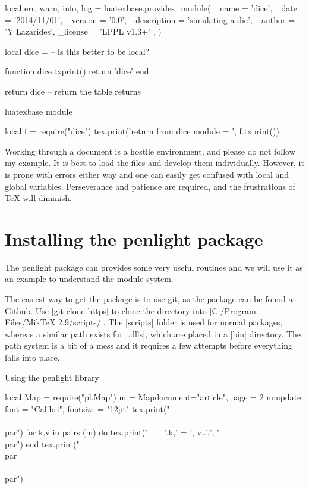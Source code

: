 \begin{teXXX}
local err, warn, info, log = luatexbase.provides_module({
     _name      = 'dice',
     _date       = '2014/11/01',
     _version   = '0.0',
     _description = 'simulating a die',
     _author      = 'Y Lazarides',
     _license      =  'LPPL v1.3+' ,
})

local dice =  {}    -- is this better to be local?

function dice.txprint()
    return 'dice'
end    

return dice         -- return the table returns {} 
\end{teXXX} 

\begin{texexample}{luatexbase module}{}

\begin{luacode}   
local  f = require("dice")           
        tex.print('return from dice module = ', f.txprint())
\end{luacode}

\end{texexample}

Working through a document is a hostile environment, and please do not follow my example. It is best to
load the files and develop them individually. However, it is prone with errors either way and one can easily get confused with local and global variables. Perseverance and patience are required, and the frustrations of TeX will diminish.

\section{Installing the penlight package}

The penlight package can provides some very useful routines and we will use it as an example
to understand the module system.

The easiest way to get the package is to use git, as the package can be found at Github. Use |git clone https|  to clone the directory into |C:/Program Files/MikTeX 2.9/scripts/|. The |scripts| folder is used for normal packages, whereas a similar path exists for |.dlls|, which are placed in a |bin| directory. The path system is a bit of a mess and it requires a few attempts before everything falls into place. 

\begin{texexample}{Using the penlight library}{}
\begin{luacode}
local Map = require("pl.Map")
       m = Map{document="article", 
                     page = 2}
       m:update {font = "Calibri", fontsize = "12pt"}               
       tex.print("\\{\\par")
       for k,v in pairs (m)  do
           tex.print('~~~~',k,' = ', v..',', "\\par")
       end   
       tex.print("\\par\\}\\par") 
\end{luacode}
\end{texexample}



